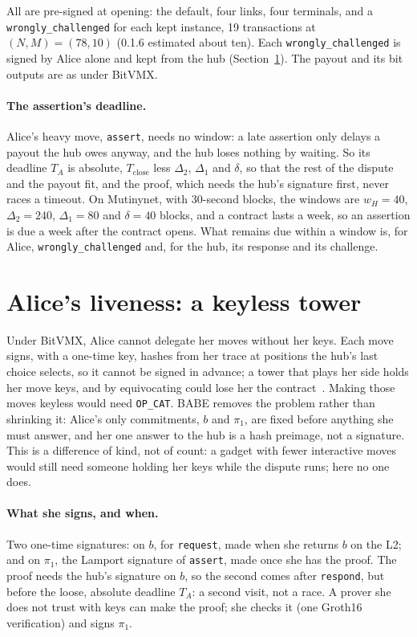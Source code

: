 \documentclass[11pt]{article}
\newcommand{\Tc}{T_{\mathrm{close}}}
\newcommand{\tx}[1]{\texttt{#1}}
\begin{document}
All are pre-signed at opening: the default, four links, four terminals,
and a \tx{wrongly\_challenged} for each kept instance, 19 transactions at
$(N, M) = (78, 10)$ (0.1.6 estimated about ten). Each
\tx{wrongly\_\allowbreak challenged} is signed by Alice alone and kept from the hub
(Section~\ref{sec:tower}). The payout and its bit outputs are as under
BitVMX.

\paragraph{The assertion's deadline.} Alice's heavy move, \tx{assert},
needs no window: a late assertion only delays a payout the hub owes
anyway, and the hub loses nothing by waiting. So its deadline $T_A$ is
absolute, $\Tc$ less $\Delta_2$, $\Delta_1$ and $\delta$, so that the
rest of the dispute and the payout fit, and the proof, which needs the
hub's signature first, never races a timeout. On Mutinynet, with
30-second blocks, the windows are $w_H = 40$, $\Delta_2 = 240$,
$\Delta_1 = 80$ and $\delta = 40$ blocks, and a contract lasts a week, so
an assertion is due a week after the contract opens. What remains due
within a window is, for Alice, \tx{wrongly\_challenged} and, for the hub,
its response and its challenge.

\section{Alice's liveness: a keyless tower}
\label{sec:tower}

Under BitVMX, Alice cannot delegate her moves without her keys. Each move
signs, with a one-time key, hashes from her trace at positions the hub's
last choice selects, so it cannot be signed in advance; a tower that
plays her side holds her move keys, and by equivocating could lose her
the contract~\cite[\S 10]{lichenbitvmx}. Making those moves keyless would
need \texttt{OP\_CAT}. BABE removes the problem rather than shrinking
it: Alice's only commitments, $b$ and $\pi_1$, are fixed before anything
she must answer, and her one answer to the hub is a hash preimage, not a
signature. This is a difference of kind, not of count: a gadget with
fewer interactive moves would still need someone holding her keys while
the dispute runs; here no one does.

\paragraph{What she signs, and when.} Two one-time signatures: on $b$,
for \tx{request}, made when she returns $b$ on the L2; and on $\pi_1$,
the Lamport signature of \tx{assert}, made once she has the proof. The
proof needs the hub's signature on $b$, so the second comes after
\tx{respond}, but before the loose, absolute deadline $T_A$: a second
visit, not a race. A prover she does not trust with keys can make the
proof; she checks it (one Groth16 verification) and signs $\pi_1$.
\end{document}
